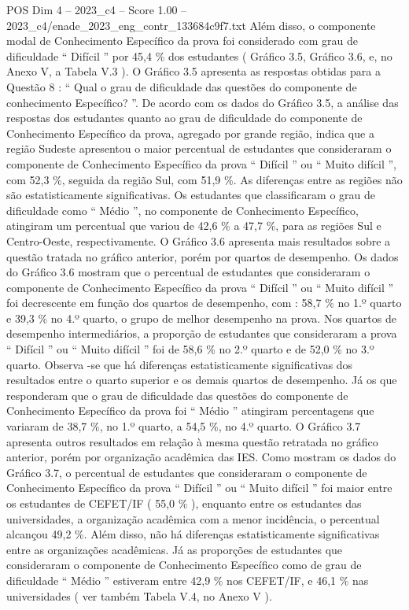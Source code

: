 \begin{textsample}{POS Dim 4 – 2023\_c4 – Score 1.00 – 2023\_c4/enade\_2023\_eng\_contr\_133684c9f7.txt}
Além disso, o componente modal de Conhecimento Específico da prova foi considerado com grau de dificuldade “ Difícil ” por 45,4 \% dos estudantes ( Gráfico 3.5, Gráfico 3.6, e, no Anexo V, a Tabela V.3 ).
O Gráfico 3.5 apresenta as respostas obtidas para a Questão 8 : “ Qual o grau de dificuldade das questões do componente de conhecimento Específico? ”.
De acordo com os dados do Gráfico 3.5, a análise das respostas dos estudantes quanto ao grau de dificuldade do componente de Conhecimento Específico da prova, agregado por grande região, indica que a região Sudeste apresentou o maior percentual de estudantes que consideraram o componente de Conhecimento Específico da prova “ Difícil ” ou “ Muito difícil ”, com 52,3 \%, seguida da região Sul, com 51,9 \%.
As diferenças entre as regiões não são estatisticamente significativas.
Os estudantes que classificaram o grau de dificuldade como “ Médio ”, no componente de Conhecimento Específico, atingiram um percentual que variou de 42,6 \% a 47,7 \%, para as regiões Sul e Centro-Oeste, respectivamente.
O Gráfico 3.6 apresenta mais resultados sobre a questão tratada no gráfico anterior, porém por quartos de desempenho.
Os dados do Gráfico 3.6 mostram que o percentual de estudantes que consideraram o componente de Conhecimento Específico da prova “ Difícil ” ou “ Muito difícil ” foi decrescente em função dos quartos de desempenho, com : 58,7 \% no 1.º quarto e 39,3 \% no 4.º quarto, o grupo de melhor desempenho na prova.
Nos quartos de desempenho intermediários, a proporção de estudantes que consideraram a prova “ Difícil ” ou “ Muito difícil ” foi de 58,6 \% no 2.º quarto e de 52,0 \% no 3.º quarto.
Observa -se que há diferenças estatisticamente significativas dos resultados entre o quarto superior e os demais quartos de desempenho.
Já os que responderam que o grau de dificuldade das questões do componente de Conhecimento Específico da prova foi “ Médio ” atingiram percentagens que variaram de 38,7 \%, no 1.º quarto, a 54,5 \%, no 4.º quarto.
O Gráfico 3.7 apresenta outros resultados em relação à mesma questão retratada no gráfico anterior, porém por organização acadêmica das IES.
Como mostram os dados do Gráfico 3.7, o percentual de estudantes que consideraram o componente de Conhecimento Específico da prova “ Difícil ” ou “ Muito difícil ” foi maior entre os estudantes de CEFET/IF ( 55,0 \% ), enquanto entre os estudantes das universidades, a organização acadêmica com a menor incidência, o percentual alcançou 49,2 \%.
Além disso, não há diferenças estatisticamente significativas entre as organizações acadêmicas.
Já as proporções de estudantes que consideraram o componente de Conhecimento Específico como de grau de dificuldade “ Médio ” estiveram entre 42,9 \% nos CEFET/IF, e 46,1 \% nas universidades ( ver também Tabela V.4, no Anexo V ).

\end{textsample}
